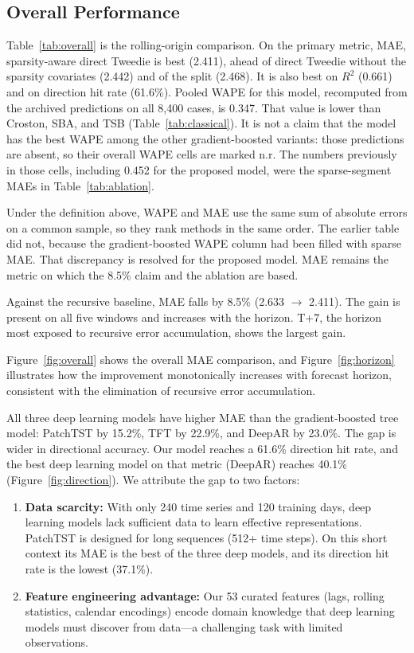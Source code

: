 \documentclass[review,authoryear]{elsarticle}
\begin{document}
\subsection{Overall Performance}

\label{sec:results}
Table~\ref{tab:overall} is the rolling-origin comparison. On the primary metric, MAE, sparsity-aware direct Tweedie is best (2.411), ahead of direct Tweedie without the sparsity covariates (2.442) and of the split (2.468). It is also best on $R^{2}$ (0.661) and on direction hit rate (61.6\%). Pooled WAPE for this model, recomputed from the archived predictions on all 8{,}400 cases, is 0.347. That value is lower than Croston, SBA, and TSB (Table~\ref{tab:classical}). It is not a claim that the model has the best WAPE among the other gradient-boosted variants: those predictions are absent, so their overall WAPE cells are marked n.r. The numbers previously in those cells, including 0.452 for the proposed model, were the sparse-segment MAEs in Table~\ref{tab:ablation}.

Under the definition above, WAPE and MAE use the same sum of absolute errors on a common sample, so they rank methods in the same order. The earlier table did not, because the gradient-boosted WAPE column had been filled with sparse MAE. That discrepancy is resolved for the proposed model. MAE remains the metric on which the 8.5\% claim and the ablation are based.

Against the recursive baseline, MAE falls by 8.5\% (2.633 $\rightarrow$ 2.411). The gain is present on all five windows and increases with the horizon. T+7, the horizon most exposed to recursive error accumulation, shows the largest gain.

Figure~\ref{fig:overall} shows the overall MAE comparison, and Figure~\ref{fig:horizon} illustrates how the improvement monotonically increases with forecast horizon, consistent with the elimination of recursive error accumulation.

All three deep learning models have higher MAE than the gradient-boosted tree model: PatchTST by 15.2\%, TFT by 22.9\%, and DeepAR by 23.0\%. The gap is wider in directional accuracy. Our model reaches a 61.6\% direction hit rate, and the best deep learning model on that metric (DeepAR) reaches 40.1\% (Figure~\ref{fig:direction}). We attribute the gap to two factors:

\begin{enumerate}
    \item \textbf{Data scarcity:} With only 240 time series and 120 training days, deep learning models lack sufficient data to learn effective representations. PatchTST is designed for long sequences (512+ time steps). On this short context its MAE is the best of the three deep models, and its direction hit rate is the lowest (37.1\%).
    \item \textbf{Feature engineering advantage:} Our 53 curated features (lags, rolling statistics, calendar encodings) encode domain knowledge that deep learning models must discover from data---a challenging task with limited observations.
\end{enumerate}
\end{document}
